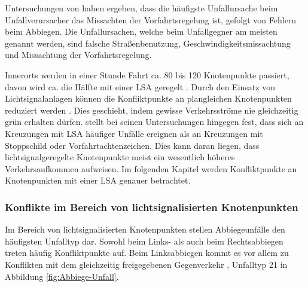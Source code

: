 Untersuchungen von \Textcite[S. 112]{Gerstenberger.17.02.2015} haben ergeben, dass die häufigste Unfallursache beim Unfallverursacher das Missachten der Vorfahrtsregelung ist, gefolgt von Fehlern beim Abbiegen. Die Unfallursachen, welche beim Unfallgegner am meisten genannt werden, sind falsche Straßenbenutzung, Geschwindigkeitsmissachtung und Missachtung der Vorfahrtsregelung. 

Innerorts werden in einer Stunde Fahrt ca. 80 bis 120 Knotenpunkte passiert, davon wird ca. die Hälfte mit einer \ac{LSA} geregelt \parencite[S. 114]{Reichart.2001}. Durch den Einsatz von Lichtsignalanlagen können die Konfliktpunkte an plangleichen Knotenpunkten reduziert werden \parencite[S. 83]{Reichart.2001}. Dies geschieht, indem gewisse Verkehrsströme nie gleichzeitig grün erhalten dürfen. \Textcite[S. 417]{AbdelAty.2005} stellt bei seinen Untersuchungen hingegen fest, dass sich an Kreuzungen mit LSA häufiger Unfälle ereignen als an Kreuzungen mit Stoppschild oder Vorfahrtachtenzeichen. Dies kann daran liegen, dass lichtsignalgeregelte Knotenpunkte meist ein wesentlich höheres Verkehrsaufkommen aufweisen. Im folgenden Kapitel werden Konfliktpunkte an Knotenpunkten mit einer \ac{LSA} genauer betrachtet.


\subsubsection{Konflikte im Bereich von lichtsignalisierten Knotenpunkten}\label{chapter:Knotenpunkte mit LSA}

Im Bereich von lichtsignalisierten Knotenpunkten stellen Abbiegeunfälle den häufigsten Unfalltyp dar. Sowohl beim Links- als auch beim Rechtsabbiegen treten häufig Konfliktpunkte auf. Beim Linksabbiegen kommt es vor allem zu Konflikten mit dem gleichzeitig freigegebenen Gegenverkehr \parencite[S. 273]{Schreiber.2016}, Unfalltyp 21 in Abbildung \ref{fig:Abbiege-Unfall}.

